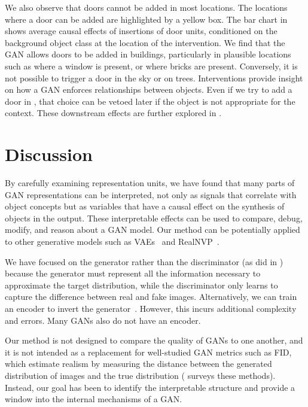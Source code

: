 \documentclass{article} %
\begin{document}
We also observe that doors cannot be added in most locations. The locations where a door can be added are highlighted by a yellow box.  The bar chart in  shows average causal effects of insertions of door units, conditioned on the background object class at the location of the intervention.  We find that the GAN allows doors to be added in buildings, particularly in plausible locations such as where a window is present, or where bricks are present.  Conversely, it is not possible to trigger a door in the sky or on trees. Interventions provide insight on how a GAN enforces relationships between objects.  Even if we try to add a door in , that choice can be vetoed later if the object is not appropriate for the context. These downstream effects are further explored in .
\section{Discussion}\vspace{-10pt}
By carefully examining representation units, we have found that many parts of GAN representations can be interpreted, not only as signals that correlate with object concepts but as variables that have a causal effect on the synthesis of objects in the output.  These interpretable effects can be used to compare, debug, modify, and reason about a GAN model. Our method can be potentially applied to other generative models such as VAEs~\citep{kingma2014auto} and RealNVP~\citep{dinh2017density}. %

We have focused on the generator rather than the discriminator (as did in \citet{radford2015unsupervised}) because the generator must represent all the information necessary to approximate the target distribution, while the discriminator only learns to capture the difference between real and fake images. Alternatively, we can train an encoder to invert the generator~\citep{donahue2016adversarial,dumoulin2016adversarially}.  However, this incurs additional complexity and errors. Many GANs also do not have an encoder.

Our method is not designed to compare the quality of GANs to one another, and it is not intended as a replacement for well-studied GAN metrics such as FID, which estimate realism by measuring the distance between the generated distribution of images and the true distribution (\citet{borji2018pros} surveys these methods).  Instead, our goal has been to identify the interpretable structure and provide a window into the internal mechanisms of a GAN.
\end{document}
